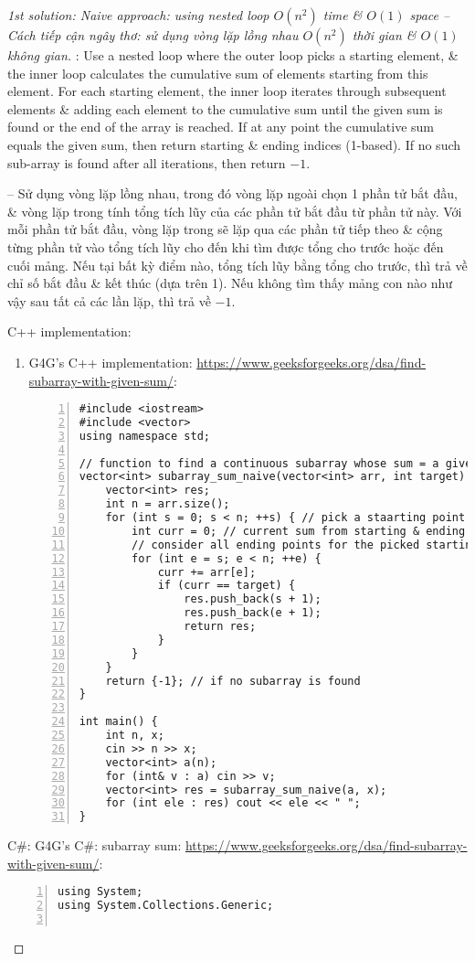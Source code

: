 \documentclass{article}
\begin{document}
\begin{proof}[1st solution: Naive approach: using nested loop $O(n^2)$ time \& $O(1)$ space -- Cách tiếp cận ngây thơ: sử dụng vòng lặp lồng nhau $O(n^2)$ thời gian \& $O(1)$ không gian]
    {\bf }: Use a nested loop where the outer loop picks a starting element, \& the inner loop calculates the cumulative sum of elements starting from this element. For each starting element, the inner loop iterates through subsequent elements \& adding each element to the cumulative sum until the given sum is found or the end of the array is reached. If at any point the cumulative sum equals the given sum, then return starting \& ending indices (1-based). If no such sub-array is found after all iterations, then return $-1$.

    -- Sử dụng vòng lặp lồng nhau, trong đó vòng lặp ngoài chọn 1 phần tử bắt đầu, \& vòng lặp trong tính tổng tích lũy của các phần tử bắt đầu từ phần tử này. Với mỗi phần tử bắt đầu, vòng lặp trong sẽ lặp qua các phần tử tiếp theo \& cộng từng phần tử vào tổng tích lũy cho đến khi tìm được tổng cho trước hoặc đến cuối mảng. Nếu tại bất kỳ điểm nào, tổng tích lũy bằng tổng cho trước, thì trả về chỉ số bắt đầu \& kết thúc (dựa trên 1). Nếu không tìm thấy mảng con nào như vậy sau tất cả các lần lặp, thì trả về $-1$.

    C++ implementation:
    \begin{enumerate}
        \item G4G's C++ implementation: \url{https://www.geeksforgeeks.org/dsa/find-subarray-with-given-sum/}:
        \begin{Verbatim}[numbers=left,xleftmargin=5mm]
#include <iostream>
#include <vector>
using namespace std;

// function to find a continuous subarray whose sum = a given number
vector<int> subarray_sum_naive(vector<int> arr, int target) {
    vector<int> res;
    int n = arr.size();
    for (int s = 0; s < n; ++s) { // pick a staarting point for a subarray
        int curr = 0; // current sum from starting & ending indices
        // consider all ending points for the picked starting point
        for (int e = s; e < n; ++e) {
            curr += arr[e];
            if (curr == target) {
                res.push_back(s + 1);
                res.push_back(e + 1);
                return res;
            }
        }
    }
    return {-1}; // if no subarray is found
}

int main() {
    int n, x;
    cin >> n >> x;
    vector<int> a(n);
    for (int& v : a) cin >> v;
    vector<int> res = subarray_sum_naive(a, x);
    for (int ele : res) cout << ele << " ";
}
        \end{Verbatim}
    \end{enumerate}
    C\#: G4G's C\#: subarray sum: \url{https://www.geeksforgeeks.org/dsa/find-subarray-with-given-sum/}:
    \begin{Verbatim}[numbers=left,xleftmargin=5mm]
using System;
using System.Collections.Generic;


\end{Verbatim}
\end{proof}
\end{document}
